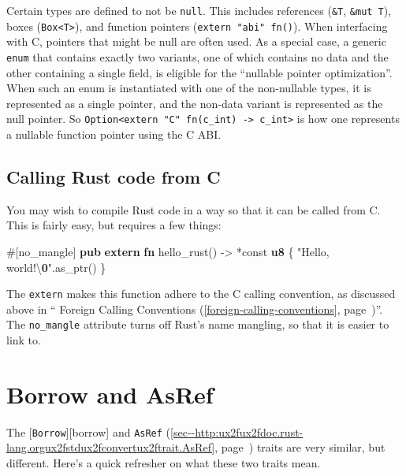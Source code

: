 \documentclass[a4paper,]{book}
\renewcommand*{\hyperref}[2][\ar]{%
  \def\ar{#2}%
  #2 (\autoref{#1}, page~\pageref{#1})}
\newenvironment{Shaded}{\begin{snugshade}}{\end{snugshade}}
\newcommand{\KeywordTok}[1]{\textcolor[rgb]{0.13,0.29,0.53}{\textbf{{#1}}}}
\newcommand{\CharTok}[1]{\textcolor[rgb]{0.31,0.60,0.02}{{#1}}}
\newcommand{\StringTok}[1]{\textcolor[rgb]{0.31,0.60,0.02}{{#1}}}
\newcommand{\OtherTok}[1]{\textcolor[rgb]{0.56,0.35,0.01}{{#1}}}
\newcommand{\ErrorTok}[1]{\textbf{{#1}}}
\newcommand{\NormalTok}[1]{{#1}}
\begin{document}
Certain types are defined to not be \texttt{null}. This includes
references (\texttt{\&T}, \texttt{\&mut\ T}), boxes
(\texttt{Box\textless{}T\textgreater{}}), and function pointers
(\texttt{extern\ "abi"\ fn()}). When interfacing with C, pointers that
might be null are often used. As a special case, a generic \texttt{enum}
that contains exactly two variants, one of which contains no data and
the other containing a single field, is eligible for the ``nullable
pointer optimization''. When such an enum is instantiated with one of
the non-nullable types, it is represented as a single pointer, and the
non-data variant is represented as the null pointer. So
\texttt{Option\textless{}extern\ "C"\ fn(c\_int)\ -\textgreater{}\ c\_int\textgreater{}}
is how one represents a nullable function pointer using the C ABI.

\subsection{Calling Rust code from C}\label{calling-rust-code-from-c}

You may wish to compile Rust code in a way so that it can be called from
C. This is fairly easy, but requires a few things:

\begin{Shaded}
\begin{Highlighting}[]
\OtherTok{#[}\NormalTok{no_mangle}\OtherTok{]}
\KeywordTok{pub} \KeywordTok{extern} \KeywordTok{fn} \NormalTok{hello_rust() -> *const }\KeywordTok{u8} \NormalTok{\{}
    \StringTok{"Hello, world!}\CharTok{\textbackslash{}}\ErrorTok{0}\StringTok{"}\NormalTok{.as_ptr()}
\NormalTok{\}}
\end{Highlighting}
\end{Shaded}

The \texttt{extern} makes this function adhere to the C calling
convention, as discussed above in
``\hyperref[foreign-calling-conventions]{Foreign Calling Conventions}''.
The \texttt{no\_mangle} attribute turns off Rust's name mangling, so
that it is easier to link to.

\section{Borrow and AsRef}\label{sec--borrow-and-asref}

The {[}\texttt{Borrow}{]}{[}borrow{]} and
\hyperref[sec--http:ux2fux2fdoc.rust-lang.orgux2fstdux2fconvertux2ftrait.AsRef]{\texttt{AsRef}}
traits are very similar, but different. Here's a quick refresher on what
these two traits mean.
\end{document}
